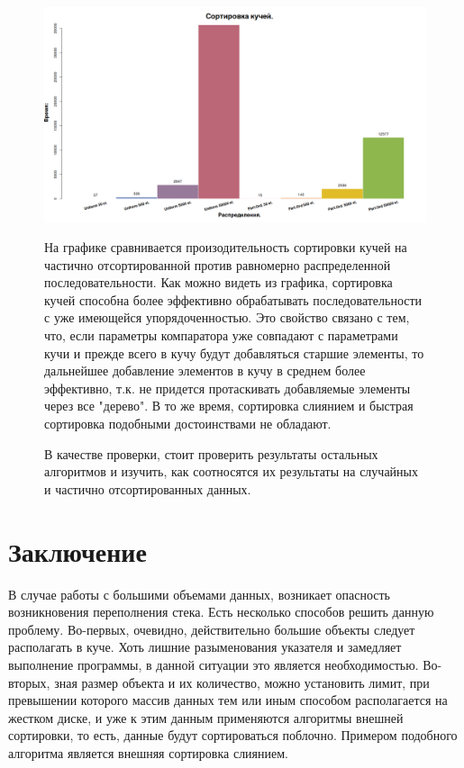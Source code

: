 \documentclass[a4paper, 14pt]{report}
\begin{document}
\begin{figure}[h]
	
	\centering
	
	\includegraphics[width=0.8\linewidth]{./images/digit_heap.png}
	
	
	\label{fig:mpr}
	
На графике сравнивается произодительность сортировки кучей на частично отсортированной против равномерно распределенной последовательности. Как можно видеть из графика, сортировка кучей способна более эффективно обрабатывать последовательности с уже имеющейся упорядоченностью. Это свойство связано с тем, что, если параметры компаратора уже совпадают с параметрами кучи и прежде всего в кучу будут добавляться старшие элементы, то дальнейшее добавление элементов в кучу в среднем более эффективно, т.к. не придется протаскивать добавляемые элементы через все "дерево". В то же время, сортировка слиянием и быстрая сортировка подобными достоинствами не обладают.

В качестве проверки, стоит проверить результаты остальных алгоритмов и изучить, как соотносятся их результаты на случайных и частично отсортированных данных.
	
\end{figure}

\section{Заключение}
В случае работы с большими объемами данных, возникает опасность возникновения переполнения стека. Есть несколько способов решить данную проблему. Во-первых, очевидно, действительно большие объекты следует располагать в куче. Хоть лишние разыменования указателя и замедляет выполнение программы, в данной ситуации это является необходимостью. Во-вторых, зная размер объекта и их количество, можно установить лимит, при превышении которого массив данных тем или иным способом располагается на жестком диске, и уже к этим данным применяются алгоритмы внешней сортировки, то есть, данные будут сортироваться поблочно. Примером подобного алгоритма является внешняя сортировка слиянием.
\end{document}
